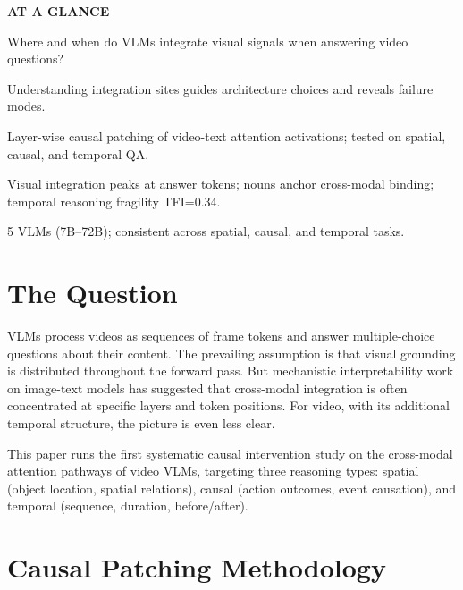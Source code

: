 \documentclass[10pt,twocolumn]{article}
\begin{document}
\begin{mdframed}[backgroundcolor=boxgray,linecolor=rulered,linewidth=1pt,
    innerleftmargin=6pt,innerrightmargin=6pt,
    innertopmargin=6pt,innerbottommargin=6pt]
\textbf{\small AT A GLANCE}\par\vspace{4pt}
\begin{description}[leftmargin=0pt,labelsep=4pt,itemsep=2pt,parsep=0pt,
    font=\small\bfseries]
  \item[Problem:] Where and when do VLMs integrate visual signals when
    answering video questions?
  \item[Why it matters:] Understanding integration sites guides
    architecture choices and reveals failure modes.
  \item[Method:] Layer-wise causal patching of video-text attention
    activations; tested on spatial, causal, and temporal QA.
  \item[Result:] Visual integration peaks at answer tokens; nouns
    anchor cross-modal binding; temporal reasoning fragility TFI=0.34.
  \item[Evidence:] 5 VLMs (7B--72B); consistent across spatial, causal,
    and temporal tasks.
\end{description}
\end{mdframed}

\section{The Question}

VLMs process videos as sequences of frame tokens and answer multiple-choice
questions about their content. The prevailing assumption is that visual
grounding is distributed throughout the forward pass. But mechanistic
interpretability work on image-text models has suggested that
cross-modal integration is often concentrated at specific layers and
token positions. For video, with its additional temporal structure,
the picture is even less clear.

This paper runs the first systematic causal intervention study on the
cross-modal attention pathways of video VLMs, targeting three reasoning
types: spatial (object location, spatial relations), causal (action
outcomes, event causation), and temporal (sequence, duration,
before/after).

\section{Causal Patching Methodology}
\end{document}
